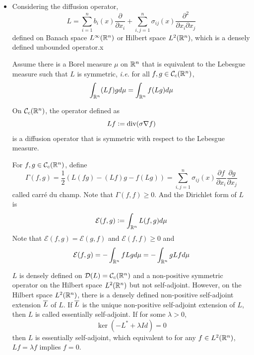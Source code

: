 \documentclass[a4paper,12pt]{article}
\begin{document}
\begin{itemize}
  \item  Considering the diffusion operator,
\begin{equation*}
  L = \sum_{i=1}^nb_i(x)\frac{\partial}{\partial x_i} + \sum_{i,j=1}^n\sigma_{ij}(x)\frac{\partial^2}{\partial x_i\partial x_j}
\end{equation*}
defined on Banach space $L^{\infty}(\mathbb{R}^n)$ or Hilbert space $L^2(\mathbb{R}^n)$, which is a densely defined unbounded operator.x

  \noindent Assume there is a Borel measure $\mu$ on $\mathbb{R}^n$ that is equivalent to the Lebesgue measure such that $L$ is symmetric, \emph{i.e.} for all $f,g \in \mathcal{C}_c(\mathbb{R}^n)$,
  \begin{equation*}
    \int_{\mathbb{R}^n}(Lf)g d\mu = \int_{\mathbb{R}^n}f(Lg)d\mu
  \end{equation*}

  \begin{exam}
    On $\mathcal{C}_c(\mathbb{R}^n)$, the operator defined as
    \begin{equation*}
      Lf \vcentcolon= \operatorname{div}(\sigma \nabla f)
    \end{equation*}
    is a diffusion operator that is symmetric with respect to the Lebesgue measure.
  \end{exam}

  \noindent For $f,g \in \mathcal{C}_c(\mathbb{R}^n)$, define
  \begin{equation*}
    \Gamma(f,g) = \frac{1}{2}(L(fg) - (Lf)g - f(Lg)) = \sum_{i,j=1}^n \sigma_{ij}(x)\frac{\partial f}{\partial x_i}\frac{\partial g}{\partial x_j}
  \end{equation*}
  called carr\'e du champ. Note that $\Gamma(f,f) \geqslant 0$. And the Dirichlet form of $L$ is
  \begin{equation*}
    \mathcal{E}(f,g) \vcentcolon= \int_{\mathbb{R}^n}L(f,g)d\mu
  \end{equation*}
  Note that $\mathcal{E}(f,g) = \mathcal{E}(g,f)$ and $\mathcal{E}(f,f) \geqslant 0$  and
  \begin{equation*}
    \mathcal{E}(f,g) = -\int_{\mathbb{R}^n}fLgd\mu = -\int_{\mathbb{R}^n}gLf d\mu
  \end{equation*}

  \noindent $L$ is densely defined on $\mathcal{D}(L) = \mathcal{C}_c(\mathbb{R}^n)$ and a non-positive symmetric operator on the Hilbert space $L^2(\mathbb{R}^n)$ but not self-adjoint. However, on the Hilbert space $L^2(\mathbb{R}^n)$, there is a densely defined non-positive self-adjoint extension $\overline{L}$ of $L$. If $\overline{L}$ is the unique non-positive self-adjoint extension of $L$, then $L$ is called essentially self-adjoint. If for some $\lambda > 0$,
  \begin{equation*}
    \ker (-L^* + \lambda Id) = 0
  \end{equation*}
  then $L$ is essentially self-adjoint, which equivalent to for any $f \in L^2(\mathbb{R}^n)$, $Lf=\lambda f$ implies $f=0$.
\end{itemize}
\end{document}
